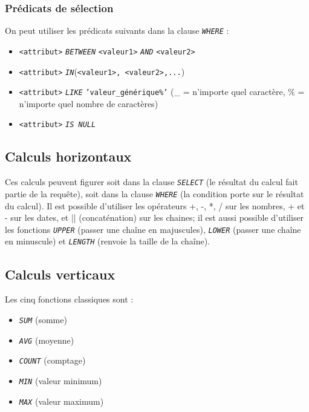 \documentclass[10pt]{article}
\begin{document}
			\subsubsection{Prédicats de sélection}
				On peut utiliser les prédicats suivants dans la clause \emph{\texttt{WHERE}} :
				\begin{itemize}
					\item \texttt{<attribut>} \emph{\texttt{BETWEEN}} \texttt{<valeur1>} \emph{\texttt{AND}} \texttt{<valeur2>}
					\item \texttt{<attribut>} \emph{\texttt{IN}}(\texttt{<valeur1>, <valeur2>,...})
					\item \texttt{<attribut>} \emph{\texttt{LIKE}} \texttt{'valeur\_générique\%'} (\_ = n'importe quel caractère, \% = n'importe quel nombre de caractères)
					\item \texttt{<attribut>} \emph{\texttt{IS NULL}}
				\end{itemize}
				
		\subsection{Calculs horizontaux}
			Ces calculs peuvent figurer soit dans la clause \emph{\texttt{SELECT}} (le résultat du calcul fait partie de la requête), soit dans la clause \emph{\texttt{WHERE}} (la condition porte sur le résultat du calcul).
			Il est possible d'utiliser les opérateurs +, -, *, / sur les nombres, + et - sur les dates, et || (concaténation) sur les chaines; il est aussi possible d'utiliser les fonctions \emph{\texttt{UPPER}} (passer une chaîne en majuscules), \emph{\texttt{LOWER}} (passer une chaîne en minuscule) et \emph{\texttt{LENGTH}} (renvoie la taille de la chaîne).
			
		\subsection{Calculs verticaux}
			Les cinq fonctions classiques sont :
			\begin{itemize}
				\item \emph{\texttt{SUM}} (somme)
				\item \emph{\texttt{AVG}} (moyenne)
				\item \emph{\texttt{COUNT}} (comptage)
				\item \emph{\texttt{MIN}} (valeur minimum) 
				\item \emph{\texttt{MAX}} (valeur maximum) 
			\end{itemize}
			
\end{document}
